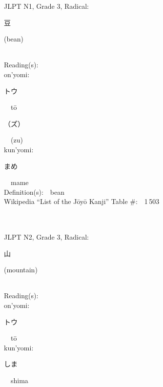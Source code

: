 \begin{multicols}{2}
{JLPT N1, Grade 3, Radical:\ \ {\begin{CJK}{UTF8}{min} 豆 \end{CJK}} (bean) } \\
Reading(s):\ \ \\
{\hspace*{1em}}on'yomi:\ \ \\
{\hspace*{2em}}{\begin{CJK}{UTF8}{min} トウ \end{CJK}}\ \ t\=o\ \ \\
{\hspace*{2em}}{\begin{CJK}{UTF8}{min} （ズ） \end{CJK}}\ \ (zu)\ \ \\
{\hspace*{1em}}kun'yomi:\ \ \\
{\hspace*{2em}}{\begin{CJK}{UTF8}{min} まめ \end{CJK}}\ \ mame\ \ \\
Definition(s):\ \ bean \\
Wikipedia ``List of the J\=oy\=o Kanji'' Table \#:\ \ 1\,503 \\
\ \ \\
{\fontsize{34pt}{40pt}  }\ \ \\  %
{JLPT N2, Grade 3, Radical:\ \ {\begin{CJK}{UTF8}{min} 山 \end{CJK}} (mountain) } \\
Reading(s):\ \ \\
{\hspace*{1em}}on'yomi:\ \ \\
{\hspace*{2em}}{\begin{CJK}{UTF8}{min} トウ \end{CJK}}\ \ t\=o\ \ \\
{\hspace*{1em}}kun'yomi:\ \ \\
{\hspace*{2em}}{\begin{CJK}{UTF8}{min} しま \end{CJK}}\ \ shima\ \ \\

\end{multicols}
